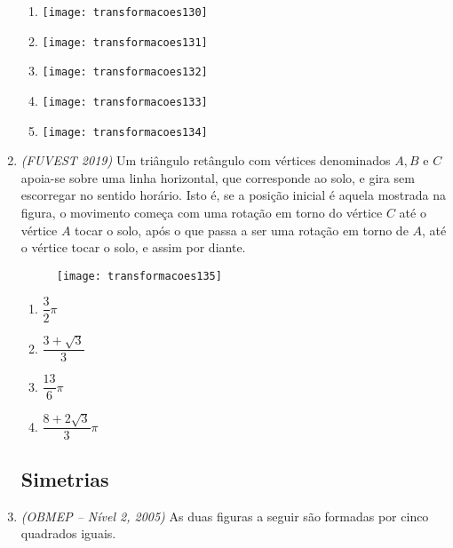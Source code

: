\begin{enumerate}
\begin{multicols}{2}
\begin{enumerate}
\item {}
{
\texttt{[image: transformacoes130]}
}

\item {}
{
\texttt{[image: transformacoes131]}
}

\item {}
{
\texttt{[image: transformacoes132]}
}

\item {}
{
\texttt{[image: transformacoes133]}
}

\item {}
{
\texttt{[image: transformacoes134]}
}
\end{enumerate}
\end{multicols}




\item \textit{(FUVEST 2019)} Um triângulo retângulo com vértices denominados $A, B$ e $C$ apoia-se sobre uma linha horizontal, que corresponde ao solo, e gira sem escorregar no sentido horário. Isto é, se a posição inicial é aquela mostrada na figura, o movimento começa com uma rotação em torno do vértice $C$ até o vértice $A$ tocar o solo, após o que passa a ser uma rotação em torno de $A$, até o vértice tocar o solo, e assim por diante.

\begin{figure}[H]
\centering

\texttt{[image: transformacoes135]}
\end{figure}


\begin{enumerate}
\item $\dfrac{3}{2}\pi$
\item $\dfrac{3+\sqrt{3}}{3}$
\item $\dfrac{13}{6}\pi$
\item $\dfrac{8+2\sqrt{3}}{3}\pi$
\end{enumerate}



\subsection{Simetrias}

\item \textit{(OBMEP – Nível 2, 2005)} As duas figuras a seguir são formadas por cinco quadrados iguais.
\begin{figure}[H]
\centering


\end{figure}
\end{enumerate}
